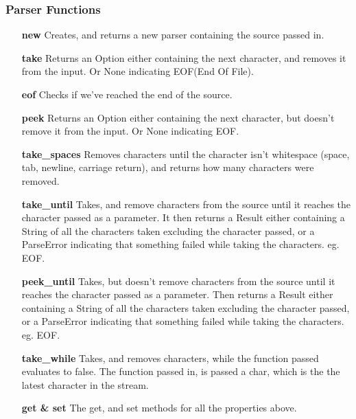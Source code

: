\subsubsection{Parser Functions}
\begin{itemize}
    
    \item[\textbf{new}] Creates, and returns a new parser containing the source passed in.
    
    \item[\textbf{take}] Returns an Option either containing the next character, and removes it from the input. Or None indicating EOF(End Of File).
    
    \item[\textbf{eof}] Checks if we've reached the end of the source.
    
    \item[\textbf{peek}] Returns an Option either containing the next character, but doesn't remove it from the input. Or None indicating EOF.

    \item[\textbf{take\_spaces}] Removes characters until the character isn't whitespace (space, tab, newline, carriage return), and returns how many characters were removed.
    \newpage
    \item[\textbf{take\_until}] Takes, and remove characters from the source until it reaches the character passed as a parameter. It then returns a Result either containing a String of all the characters taken excluding the character passed, or a ParseError indicating that something failed while taking the characters. eg. EOF.

    \item[\textbf{peek\_until}] Takes, but doesn't remove characters from the source until it reaches the character passed as a parameter. Then returns a Result either containing a String of all the characters taken excluding the character passed, or a ParseError indicating that something failed while taking the characters. eg. EOF.
    
    \item[\textbf{take\_while}] Takes, and removes characters, while the function passed evaluates to false. The function passed in, is passed a char, which is the the latest character in the stream.
    
    \item[\textbf{get \& set}] The get, and set methods for all the properties above.
\end{itemize}

